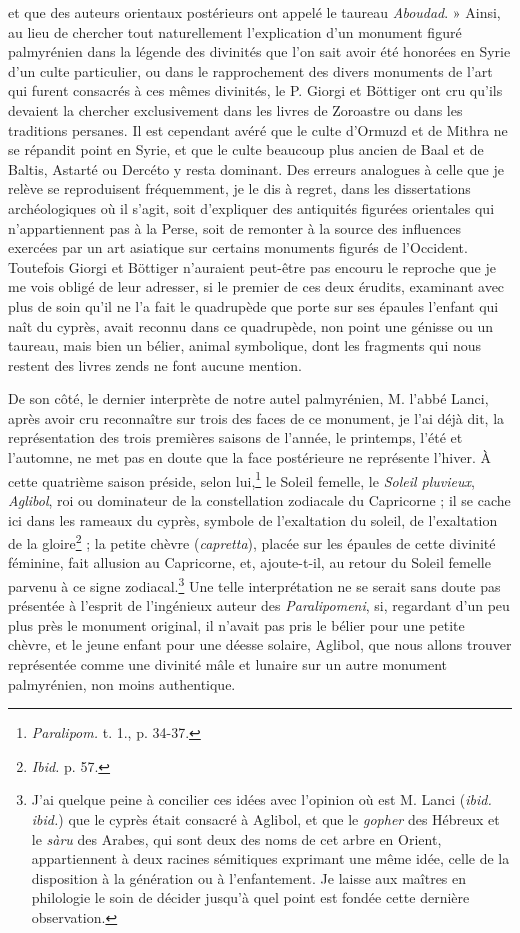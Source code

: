 \documentclass{article}
\begin{document}
et que des auteurs orientaux postérieurs ont appelé le taureau \emph{Aboudad}. » Ainsi, au lieu de chercher tout naturellement l'explication d'un monument figuré palmyrénien dans la légende des divinités que l'on sait avoir été honorées en Syrie d'un culte particulier, ou dans le rapprochement des divers monuments de l'art qui furent consacrés à ces mêmes divinités, le P. Giorgi et Böttiger ont cru qu'ils devaient la chercher exclusivement dans les livres de Zoroastre ou dans les traditions persanes. Il est cependant avéré que le culte d'Ormuzd et de Mithra ne se répandit point en Syrie, et que le culte beaucoup plus ancien de Baal et de Baltis, Astarté ou Dercéto y resta dominant. Des erreurs analogues à celle que je relève se reproduisent fréquemment, je le dis à regret, dans les dissertations archéologiques où il s'agit, soit d'expliquer des antiquités figurées orientales qui n'appartiennent pas à la Perse, soit de remonter à la source des influences exercées par un art asiatique sur certains monuments figurés de l'Occident. Toutefois Giorgi et Böttiger n'auraient peut-être pas encouru le reproche que je me vois obligé de leur adresser, si le premier de ces deux érudits, examinant avec plus de soin qu'il ne l'a fait le quadrupède que porte sur ses épaules l'enfant qui naît du cyprès, avait reconnu dans ce quadrupède, non point une génisse ou un taureau, mais bien un bélier, animal symbolique, dont les fragments qui nous restent des livres zends ne font aucune mention.

De son côté, le dernier interprète de notre autel palmyrénien, M. l'abbé Lanci, après avoir cru reconnaître sur trois des faces de ce monument, je l'ai déjà dit, la représentation des trois premières saisons de l'année, le printemps, l'été et l'automne, ne met pas en doute que la face postérieure ne représente l'hiver. À cette quatrième saison préside, selon lui,\footnote{\emph{Paralipom.} t. 1., p. 34-37.} le Soleil femelle, le \emph{Soleil pluvieux}, \emph{Aglibol}, roi ou dominateur de la constellation zodiacale du Capricorne ; il se cache ici dans les rameaux du cyprès, symbole de l'exaltation du soleil, de l'exaltation de la gloire\footnote{\emph{Ibid.} p. 57.} ; la petite chèvre (\emph{capretta}), placée sur les épaules de cette divinité féminine, fait allusion au Capricorne, et, ajoute-t-il, au retour du Soleil femelle parvenu à ce signe zodiacal.\footnote{J'ai quelque peine à concilier ces idées avec l'opinion où est M. Lanci (\emph{ibid. ibid.}) que le cyprès était consacré à Aglibol, et que le \emph{gopher} des Hébreux et le \emph{sàru} des Arabes, qui sont deux des noms de cet arbre en Orient, appartiennent à deux racines sémitiques exprimant une même idée, celle de la disposition à la génération ou à l'enfantement. Je laisse aux maîtres en philologie le soin de décider jusqu'à quel point est fondée cette dernière observation.} Une telle interprétation ne se serait sans doute pas présentée à l'esprit de l'ingénieux auteur des \emph{Paralipomeni}, si, regardant d'un peu plus près le monument original, il n'avait pas pris le bélier pour une petite chèvre, et le jeune enfant pour une déesse solaire, Aglibol, que nous allons trouver représentée comme une divinité mâle et lunaire sur un autre monument palmyrénien, non moins authentique.
\end{document}
